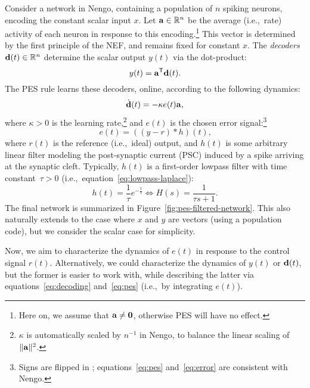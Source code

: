 Consider a network in Nengo, containing a population of $n$ spiking neurons, encoding the constant scalar input $x$.
Let $\mathbf{a} \in \mathbb{R}^n$ be the average (i.e.,~rate) activity of each neuron in response to this encoding.\footnote{Here on, we assume that $\mathbf{a} \ne \mathbf{0}$, otherwise PES will have no effect.}
This vector is determined by the first principle of the NEF, and remains fixed for constant $x$.
The \emph{decoders} $\mathbf{d}(t) \in \mathbb{R}^n$ determine the scalar output $y(t)$ via the dot-product:
\begin{equation}
\label{eq:decoding}
y(t) = {\mathbf{a}}^\mathsf{T} \mathbf{d}(t)  \text{.}
\end{equation}
The PES rule learns these decoders, online, according to the following dynamics:
\begin{equation}
\label{eq:pes}
\dot{\mathbf{d}}(t) = -\kappa e(t) \mathbf{a} \text{,}
\end{equation}
where $\kappa > 0$ is the learning rate,\footnote{$\kappa$ is automatically scaled by $n^{-1}$ in Nengo, to balance the linear scaling of $\|\mathbf{a}\|^2$.} and $e(t)$ is the chosen error signal:\footnote{Signs are flipped in \citet{voelker2015}; equations~\ref{eq:pes} and~\ref{eq:error} are consistent with Nengo.}
\begin{equation}
\label{eq:error}
e(t) = \left((y - r) \ast h \right)(t) \text{,}
\end{equation}
where $r(t)$ is the reference (i.e.,~ideal) output, and $h(t)$ is some arbitrary linear filter modeling the post-synaptic current (PSC) induced by a spike arriving at the synaptic cleft.
Typically, $h(t)$ is a first-order lowpass filter with time constant~$\tau > 0$ (i.e.,~equation~\ref{eq:lowpass-laplace}):
\begin{equation}
\label{eq:lowpass}
h(t) = \frac{1}{\tau} e^{-\frac{t}{\tau}} \iff H(s) = \frac{1}{\tau s + 1} \text{.}
\end{equation}
The final network is summarized in Figure~\ref{fig:pes-filtered-network}.
This also naturally extends to the case where $x$ and $y$ are vectors (using a population code), but we consider the scalar case for simplicity. 

Now, we aim to characterize the dynamics of $e(t)$ in response to the control signal $r(t)$.
Alternatively, we could characterize the dynamics of $y(t)$ or $\mathbf{d}(t)$, but the former is easier to work with, while describing the latter via equations~\ref{eq:decoding} and~\ref{eq:pes} (i.e.,~by integrating $e(t)$).

